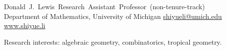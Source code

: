 \documentclass[10pt]{article}
\begin{document}
  {\mbox{Donald J. Lewis Research Assistant Professor (non-tenure-track)}\\
   Department of Mathematics, University of Michigan}
  {\color{moss}\href{mailto:shiyueli@umich.edu}{shiyueli@umich.edu}\\
   \href{https://www.shiyue.li}{www.shiyue.li}}

\vspace{14pt}
Research interests: algebraic geometry, combinatorics, tropical geometry.











\end{document}
